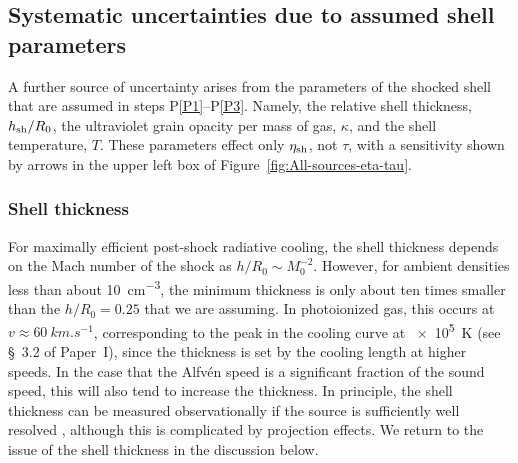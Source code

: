 \subsection{Systematic uncertainties due to assumed shell parameters}
\label{sec:syst-uncert-due}

A further source of uncertainty arises from the parameters of the
shocked shell that are assumed in steps P\ref{P1}--P\ref{P3}. Namely,
the relative shell thickness, \(h_{\text{sh}}/R_0\), the ultraviolet grain
opacity per mass of gas, \(\kappa\), and the shell temperature, \(T\).
These parameters effect only \(\eta_{\text{sh}}\), not \(\tau\), with a
sensitivity shown by arrows in the upper left box of
Figure~\ref{fig:All-sources-eta-tau}.

\subsubsection{Shell thickness}
\label{sec:shell-thickness}
For maximally efficient post-shock radiative cooling, the shell
thickness depends on the Mach number of the shock as
\(h / R_0 \sim M_0^{-2}\).  However, for ambient densities less than
about \SI{10}{cm^{-3}}, the minimum thickness is only about ten times
smaller than the \(h / R_0 = 0.25\) that we are assuming.  In
photoionized gas, this occurs at \(v \approx \SI{60}{km.s^{-1}}\),
corresponding to the peak in the cooling curve at \SI{e5}{K} (see
\S~3.2 of Paper~I),
since the thickness is set by the cooling length at higher speeds.  In
the case that the Alfv\'en speed is a significant fraction of the
sound speed, this will also tend to increase the thickness.  In
principle, the shell thickness can be measured observationally if the
source is sufficiently well resolved \citep{Kobulnicky:2017a},
although this is complicated by projection effects.  We return to the
issue of the shell thickness in the discussion below.


